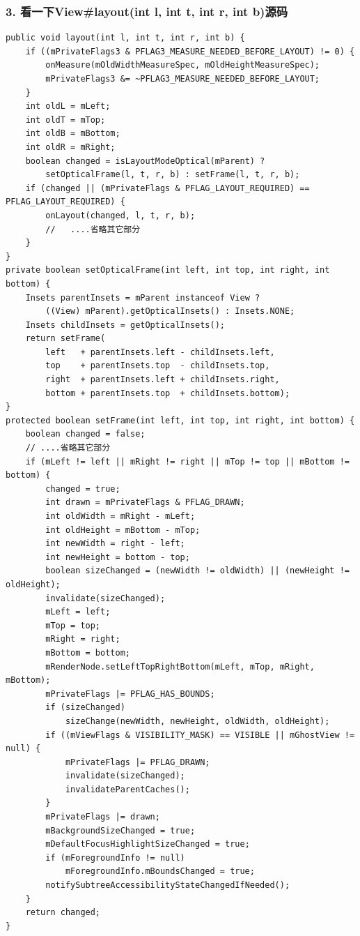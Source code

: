 \documentclass[9pt, b5paper]{article}
\begin{document}
\subsubsection{3. 看一下View\#layout(int l, int t, int r, int b)源码}
\label{sec-1-5-3}
\begin{verbatim}
public void layout(int l, int t, int r, int b) {
    if ((mPrivateFlags3 & PFLAG3_MEASURE_NEEDED_BEFORE_LAYOUT) != 0) {
        onMeasure(mOldWidthMeasureSpec, mOldHeightMeasureSpec);
        mPrivateFlags3 &= ~PFLAG3_MEASURE_NEEDED_BEFORE_LAYOUT;
    }
    int oldL = mLeft;
    int oldT = mTop;
    int oldB = mBottom;
    int oldR = mRight;
    boolean changed = isLayoutModeOptical(mParent) ?
        setOpticalFrame(l, t, r, b) : setFrame(l, t, r, b);
    if (changed || (mPrivateFlags & PFLAG_LAYOUT_REQUIRED) == PFLAG_LAYOUT_REQUIRED) {
        onLayout(changed, l, t, r, b);
        //   ....省略其它部分
    }
}
private boolean setOpticalFrame(int left, int top, int right, int bottom) {
    Insets parentInsets = mParent instanceof View ?
        ((View) mParent).getOpticalInsets() : Insets.NONE;
    Insets childInsets = getOpticalInsets();
    return setFrame(
        left   + parentInsets.left - childInsets.left,
        top    + parentInsets.top  - childInsets.top,
        right  + parentInsets.left + childInsets.right,
        bottom + parentInsets.top  + childInsets.bottom);
}
protected boolean setFrame(int left, int top, int right, int bottom) {
    boolean changed = false;
    // ....省略其它部分
    if (mLeft != left || mRight != right || mTop != top || mBottom != bottom) {
        changed = true;
        int drawn = mPrivateFlags & PFLAG_DRAWN;
        int oldWidth = mRight - mLeft;
        int oldHeight = mBottom - mTop;
        int newWidth = right - left;
        int newHeight = bottom - top;
        boolean sizeChanged = (newWidth != oldWidth) || (newHeight != oldHeight);
        invalidate(sizeChanged);
        mLeft = left;
        mTop = top;
        mRight = right;
        mBottom = bottom;
        mRenderNode.setLeftTopRightBottom(mLeft, mTop, mRight, mBottom);
        mPrivateFlags |= PFLAG_HAS_BOUNDS;
        if (sizeChanged) 
            sizeChange(newWidth, newHeight, oldWidth, oldHeight);
        if ((mViewFlags & VISIBILITY_MASK) == VISIBLE || mGhostView != null) {
            mPrivateFlags |= PFLAG_DRAWN;
            invalidate(sizeChanged);
            invalidateParentCaches();
        }
        mPrivateFlags |= drawn;
        mBackgroundSizeChanged = true;
        mDefaultFocusHighlightSizeChanged = true;
        if (mForegroundInfo != null) 
            mForegroundInfo.mBoundsChanged = true;
        notifySubtreeAccessibilityStateChangedIfNeeded();
    }
    return changed;
}
\end{verbatim}
\end{document}
